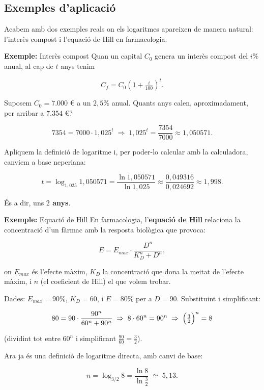 \subsection{Exemples d'aplicació}

Acabem amb dos exemples reals on els logaritmes apareixen de manera natural: l'interès compost i l'equació de Hill en farmacologia.

\begin{exemple}{\textbf{Exemple:} Interès compost}
Quan un capital $C_0$ genera un interès compost del $i\%$ anual, al cap de $t$ anys tenim

\[
C_f = C_0 \left( 1 + \tfrac{i}{100}\right)^t.
\]

Suposem $C_0=7.000$ € a un $2{,}5\%$ anual. Quants anys calen, aproximadament, per arribar a $7.354$ €?

\[
7354 = 7000 \cdot 1{,}025^t
\;\Rightarrow\;
1{,}025^t = \frac{7354}{7000} \approx 1{,}050571.
\]

Apliquem la definició de logaritme i, per poder-lo calcular amb la calculadora, canviem a base neperiana:

\[
t = \log_{1{,}025} 1{,}050571
= \frac{\ln 1{,}050571}{\ln 1{,}025}
\approx \frac{0{,}049316}{0{,}024692}
\approx 1{,}998.
\]

És a dir, uns \textbf{$2$ anys}.
\end{exemple}

\begin{exemple}{\textbf{Exemple:} Equació de Hill}
En farmacologia, l'\textbf{equació de Hill} relaciona la concentració d'un fàrmac amb la resposta biològica que provoca:

\[
E = E_{max} \cdot \frac{D^n}{K_D^n+D^n},
\]

on $E_{max}$ és l'efecte màxim, $K_D$ la concentració que dona la meitat de l'efecte màxim, i $n$ (el coeficient de Hill) el que volem trobar.

Dades: $E_{max}=90\%$, $K_D=60$, i $E=80\%$ per a $D=90$. Substituint i simplificant:

\[
80 = 90 \cdot \frac{90^n}{60^n+90^n}
\;\Rightarrow\;
8\cdot 60^n = 90^n
\;\Rightarrow\;
\Bigl(\tfrac{3}{2}\Bigr)^n = 8
\]

(dividint tot entre $60^n$ i simplificant $\tfrac{90}{60}=\tfrac32$).

Ara ja és una definició de logaritme directa, amb canvi de base:

\[
n = \log_{3/2} 8
= \frac{\ln 8}{\ln \frac{3}{2}}
\;\simeq\; 5{,}13.
\]
\end{exemple}

